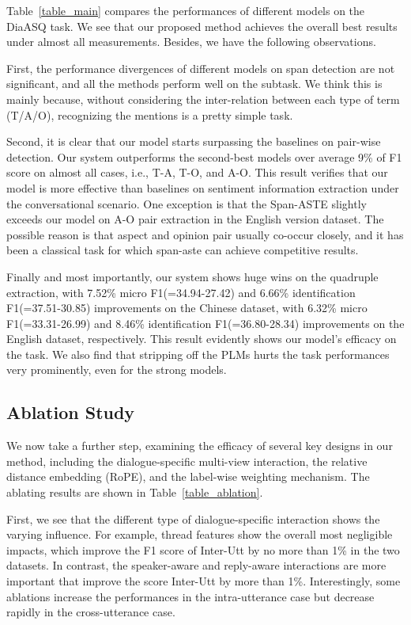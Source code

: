 \documentclass[11pt]{article}
\begin{document}
Table~\ref{table_main} compares the performances of different models on the DiaASQ task. 
We see that our proposed method achieves the overall best results under almost all measurements.
Besides, we have the following observations.

First, the performance divergences of different models on span detection are not significant, and all the methods perform well on the subtask.
We think this is mainly because, without considering the inter-relation between each type of term (T/A/O), recognizing the mentions is a pretty simple task.

Second, it is clear that our model starts surpassing the baselines on pair-wise detection.
Our system outperforms the second-best models over average 9\% of F1 score on almost all cases, i.e., T-A, T-O, and A-O.
This result verifies that our model is more effective than baselines on sentiment information extraction under the conversational scenario.
One exception is that the Span-ASTE slightly exceeds our model on A-O pair extraction in the English version dataset.
The possible reason is that aspect and opinion pair usually co-occur closely, and it has been a classical task for which span-aste can achieve competitive results. 

Finally and most importantly, our system shows huge wins on the quadruple extraction, with 7.52\% micro F1(=34.94-27.42) and 6.66\% identification F1(=37.51-30.85) improvements on the Chinese dataset, with 6.32\% micro F1(=33.31-26.99) and 8.46\% identification F1(=36.80-28.34) improvements on the English dataset, respectively.
This result evidently shows our model's efficacy on the task.
We also find that stripping off the PLMs hurts the task performances very prominently, even for the strong models.

\subsection{Ablation Study}

We now take a further step, examining the efficacy of several key designs in our method, including the dialogue-specific multi-view interaction, the relative distance embedding (RoPE), and the label-wise weighting mechanism.
The ablating results are shown in Table~\ref{table_ablation}.

First, we see that the different type of dialogue-specific interaction shows the varying influence.
For example, thread features show the overall most negligible impacts, which improve the F1 score of Inter-Utt by no more than 1\% in the two datasets.
In contrast, the speaker-aware and reply-aware interactions are more important that improve the score Inter-Utt by more than 1\%.
Interestingly, some ablations increase the performances in the intra-utterance case but decrease rapidly in the cross-utterance case.
\end{document}
